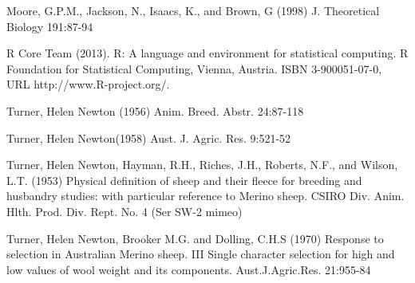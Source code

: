 \documentclass[titlepage]{article}  %
\begin{document}
\begin{thebibliography}{99}
Moore, G.P.M., Jackson, N., Isaacs, K., and Brown, G (1998) J. Theoretical Biology 191:87-94


R Core Team (2013). R: A language and environment for statistical
  computing. R Foundation for Statistical Computing, Vienna, Austria.
  ISBN 3-900051-07-0, URL http://www.R-project.org/.


Turner, Helen Newton (1956) Anim. Breed. Abstr. 24:87-118

Turner, Helen Newton(1958) Aust. J. Agric. Res. 9:521-52

Turner, Helen Newton, Hayman, R.H., Riches, J.H., Roberts, N.F., and Wilson, L.T. (1953) Physical definition of sheep and their fleece for breeding and husbandry studies: with particular reference to Merino sheep. CSIRO Div. Anim. Hlth. Prod. Div. Rept. No. 4 (Ser SW-2 mimeo)

Turner, Helen Newton, Brooker M.G. and Dolling, C.H.S (1970) Response to selection in Australian Merino sheep. III Single character selection for high and low values of wool weight and its components. Aust.J.Agric.Res. 21:955-84

\end{thebibliography}
\end{document}
